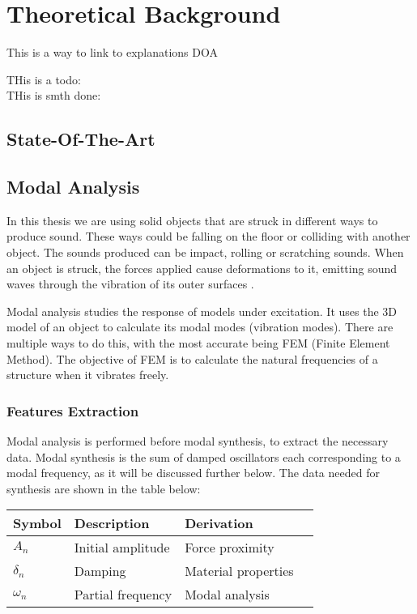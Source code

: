 \chapter{Theoretical Background}\label{ch:theory}
\mbox{}\par
This is a way to link to explanations \gls{DOA} 

THis is a todo: 
\\
THis is smth done:
\done{}

\section{State-Of-The-Art}\label{sec:state_art}
\mbox{}\par

\section{Modal Analysis}\label{sec:modal_analysis}
\mbox{}\par
In this thesis we are using solid objects that are struck in different ways to produce sound. These ways could be falling on the floor or colliding with another object. The sounds produced can be impact, rolling or scratching sounds. When an object is struck, the forces applied cause deformations to it, emitting sound waves through the vibration of its outer surfaces \cite{van2001foleyautomatic}.

Modal analysis studies the response of models under excitation. It uses the 3D model of an object to calculate its modal modes (vibration modes). There are multiple ways to do this, with the most accurate being FEM (Finite Element Method). The objective of FEM is to calculate the natural frequencies of a structure when it vibrates freely.

\subsection{Features Extraction}\label{sec:features_extract}
\mbox{}\par
Modal analysis is performed before modal synthesis, to extract the necessary data. Modal synthesis is the sum of damped oscillators each corresponding to a modal frequency, as it will be discussed further below. The data needed for synthesis are shown in the table below:

\begin{center}
    \begin{tabular}{ | l | l | l | p{5cm} |}
    \hline
    \textbf{Symbol} & \textbf{Description} & \textbf{Derivation} \\ \hline
    $A_n$ & Initial amplitude & Force proximity \\ \hline
    $\delta_n$ & Damping & Material properties \\ \hline
    $\omega_n$ & Partial frequency & Modal analysis \\
    \hline
    \end{tabular}
\end{center} 
 
